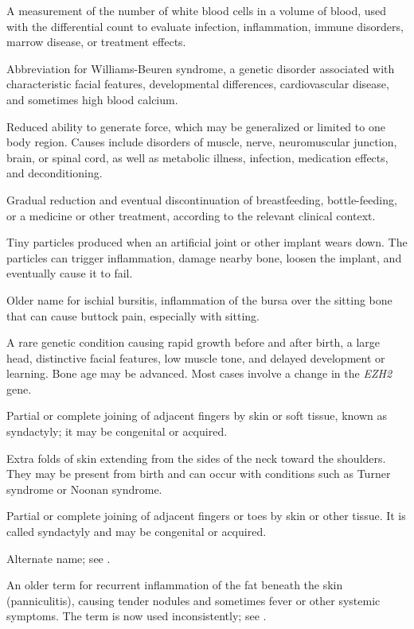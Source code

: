  A measurement of the number of white blood cells in a volume of blood, used with the differential count to evaluate infection, inflammation, immune disorders, marrow disease, or treatment effects.

 Abbreviation for Williams-Beuren syndrome, a genetic disorder associated with characteristic facial features, developmental differences, cardiovascular disease, and sometimes high blood calcium.

 Reduced ability to generate force, which may be generalized or limited to one body region. Causes include disorders of muscle, nerve, neuromuscular junction, brain, or spinal cord, as well as metabolic illness, infection, medication effects, and deconditioning.

 Gradual reduction and eventual discontinuation of breastfeeding, bottle-feeding, or a medicine or other treatment, according to the relevant clinical context.

 Tiny particles produced when an artificial joint or other implant wears down. The particles can trigger inflammation, damage nearby bone, loosen the implant, and eventually cause it to fail.

 Older name for ischial bursitis, inflammation of the bursa over the sitting bone that can cause buttock pain, especially with sitting.

 A rare genetic condition causing rapid growth before and after birth, a large head, distinctive facial features, low muscle tone, and delayed development or learning. Bone age may be advanced. Most cases involve a change in the \textit{EZH2} gene.

 Partial or complete joining of adjacent fingers by skin or soft tissue, known as syndactyly; it may be congenital or acquired.

 Extra folds of skin extending from the sides of the neck toward the shoulders. They may be present from birth and can occur with conditions such as Turner syndrome or Noonan syndrome.

 Partial or complete joining of adjacent fingers or toes by skin or other tissue. It is called syndactyly and may be congenital or acquired.

 Alternate name; see .

 An older term for recurrent inflammation of the fat beneath the skin (panniculitis), causing tender nodules and sometimes fever or other systemic symptoms. The term is now used inconsistently; see .

